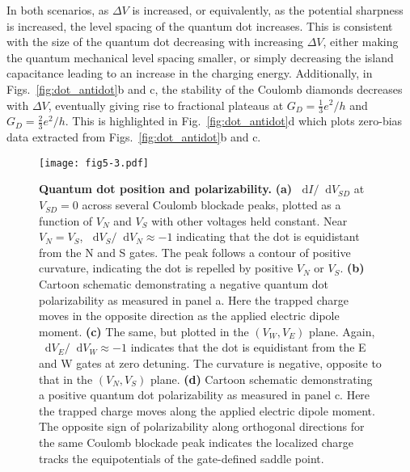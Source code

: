 \documentclass[reprint,prl,aps,superscriptaddress]{revtex4-1}
\newcommand\dif{\mathop{}\!\mathrm{d}}
\begin{document}
In both scenarios, as $\Delta V$ is increased, or equivalently, as the potential sharpness is increased, the level spacing of the quantum dot increases.  This is consistent with the size of the quantum dot decreasing with increasing $\Delta V$, either making the quantum mechanical level spacing smaller, or simply decreasing the island capacitance leading to an increase in the charging energy.  Additionally, in Figs.~\ref{fig:dot_antidot}b and c, the stability of the Coulomb diamonds decreases with $\Delta V$, eventually giving rise to fractional plateaus at $G_D = \frac{1}{3} e^2/h$ and $G_D = \frac{2}{3} e^2/h$.  This is highlighted in Fig.~\ref{fig:dot_antidot}d which plots zero-bias data extracted from Figs.~\ref{fig:dot_antidot}b and c.

\begin{figure}
    \texttt{[image: fig5-3.pdf]}
    \caption{\textbf{Quantum dot position and polarizability.} 
    \textbf{(a)} $\dif I/\dif V_{SD}$ at $V_{SD}=0$ across several Coulomb blockade peaks, plotted as a function of $V_N$ and $V_S$ with other voltages held constant.  Near $V_N=V_S$, $\dif V_S/\dif V_N\approx-1$ indicating that the dot is equidistant from the N and S gates.  The peak follows a contour of positive curvature, indicating the dot is repelled by positive $V_N$ or $V_S$. \textbf{(b)}  Cartoon schematic demonstrating a negative quantum dot polarizability as measured in panel a.  Here the trapped charge moves in the opposite direction as the applied electric dipole moment.
    \textbf{(c)} The same, but plotted in the $(V_W,V_E)$ plane. Again, $\dif V_E/\dif V_W\approx-1$ indicates that the dot is equidistant from the E and W gates at zero detuning.  The curvature is negative, opposite to that in the $(V_N,V_S)$ plane. \textbf{(d)} Cartoon schematic demonstrating a positive quantum dot polarizability as measured in panel c.  Here the trapped charge moves along the applied electric dipole moment.  The opposite sign of polarizability along orthogonal directions for the same Coulomb blockade peak indicates the localized charge tracks the equipotentials of the gate-defined saddle point.}
    \label{fig:dot_polarizability}
\end{figure}
\end{document}
